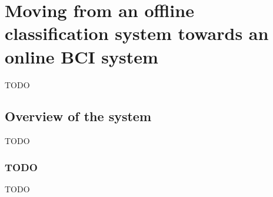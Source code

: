 



\chapter{Moving from an offline classification system towards an online BCI system}
\label{ch:online_bci_system}
TODO

\section{Overview of the system}
\label{sec:final_system_overview}
TODO


\subsection{TODO}
\label{subsec:final_system_overview_XXX}
TODO

